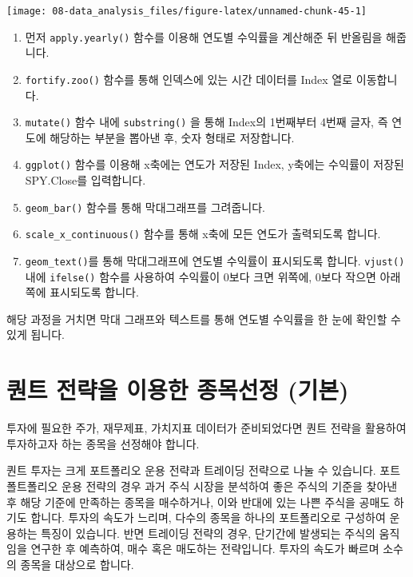 \documentclass[12pt,]{book}
\providecommand{\tightlist}{%
  \setlength{\itemsep}{0pt}\setlength{\parskip}{0pt}}
\begin{document}
\begin{center}\texttt{[image: 08-data\_analysis\_files/figure-latex/unnamed-chunk-45-1]} \end{center}

\begin{enumerate}
\def\labelenumi{\arabic{enumi}.}
\tightlist
\item
  먼저 \texttt{apply.yearly()} 함수를 이용해 연도별 수익률을 계산해준 뒤 반올림을 해줍니다.
\item
  \texttt{fortify.zoo()} 함수를 통해 인덱스에 있는 시간 데이터를 Index 열로 이동합니다.
\item
  \texttt{mutate()} 함수 내에 \texttt{substring()} 을 통해 Index의 1번째부터 4번째 글자, 즉 연도에 해당하는 부분을 뽑아낸 후, 숫자 형태로 저장합니다.
\item
  \texttt{ggplot()} 함수를 이용해 x축에는 연도가 저장된 Index, y축에는 수익률이 저장된 SPY.Close를 입력합니다.
\item
  \texttt{geom\_bar()} 함수를 통해 막대그래프를 그려줍니다.
\item
  \texttt{scale\_x\_continuous()} 함수를 통해 x축에 모든 연도가 출력되도록 합니다.
\item
  \texttt{geom\_text()}를 통해 막대그래프에 연도별 수익률이 표시되도록 합니다. \texttt{vjust()} 내에 \texttt{ifelse()} 함수를 사용하여 수익률이 0보다 크면 위쪽에, 0보다 작으면 아래쪽에 표시되도록 합니다.
\end{enumerate}

해당 과정을 거치면 막대 그래프와 텍스트를 통해 연도별 수익률을 한 눈에 확인할 수 있게 됩니다.

\hypertarget{section-45}{%
\chapter{퀀트 전략을 이용한 종목선정 (기본)}\label{section-45}}

투자에 필요한 주가, 재무제표, 가치지표 데이터가 준비되었다면 퀀트 전략을 활용하여 투자하고자 하는 종목을 선정해야 합니다.

퀀트 투자는 크게 포트폴리오 운용 전략과 트레이딩 전략으로 나눌 수 있습니다. 포트폴트폴리오 운용 전략의 경우 과거 주식 시장을 분석하여 좋은 주식의 기준을 찾아낸 후 해당 기준에 만족하는 종목을 매수하거나, 이와 반대에 있는 나쁜 주식을 공매도 하기도 합니다. 투자의 속도가 느리며, 다수의 종목을 하나의 포트폴리오로 구성하여 운용하는 특징이 있습니다. 반면 트레이딩 전략의 경우, 단기간에 발생되는 주식의 움직임을 연구한 후 예측하여, 매수 혹은 매도하는 전략입니다. 투자의 속도가 빠르며 소수의 종목을 대상으로 합니다.
\end{document}
